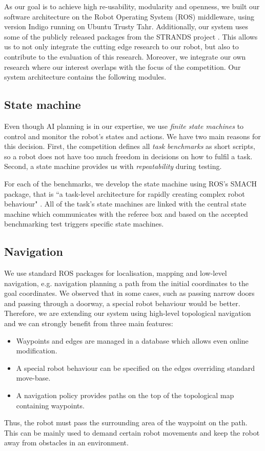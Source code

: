 As our goal is to achieve high re-usability, modularity and openness, we built our software architecture on the Robot Operating System (ROS) middleware, using version Indigo \cite{ros} running on Ubuntu Trusty Tahr. 
Additionally, our system uses some of the publicly released packages from the STRANDS project \cite{strands}. 
This allows us to not only integrate the cutting edge research to our robot, but also to contribute to the evaluation of this research. 
Moreover, we integrate our own research where our interest overlaps with the focus of the competition.
Our system architecture contains the following modules.

\subsection{State machine}

Even though AI planning is in our expertise, we use \textit{finite state machines} to control and monitor the robot's states and actions. 
We have two main reasons for this decision. First, the competition defines all \textit{task benchmarks} as short scripts, so a robot does not have too much freedom in decisions on how to fulfil a task. Second, a state machine provides us with \textit{repeatability} during testing.


For each of the benchmarks, we develop the state machine using ROS's SMACH package, that is ``a task-level architecture for rapidly creating complex robot behaviour" \cite{smach}. 
All of the task's state machines are linked with the central state machine which communicates with the referee box and based on the accepted benchmarking test triggers specific state machines. 

\subsection{Navigation}

We use standard ROS packages for localisation, mapping and low-level navigation, e.g. navigation planning a path from the initial coordinates to the goal coordinates. 
We observed that in some cases, such as passing narrow doors and passing through a doorway, a special robot behaviour would be better. 
Therefore, we are extending our system using high-level topological navigation \cite{jaime} and we can strongly benefit from three main features:

\begin{itemize}
\item Waypoints and edges are managed in a database which allows even online modification.  
\item A special robot behaviour can be specified on the edges overriding standard move-base.
\item A navigation policy \cite{bruno} provides paths on the top of the topological map containing waypoints. 
\end{itemize}
Thus, the robot must pass the surrounding area of the waypoint on the path. This can be mainly used to demand certain robot movements and keep the robot away from obstacles in an environment.



